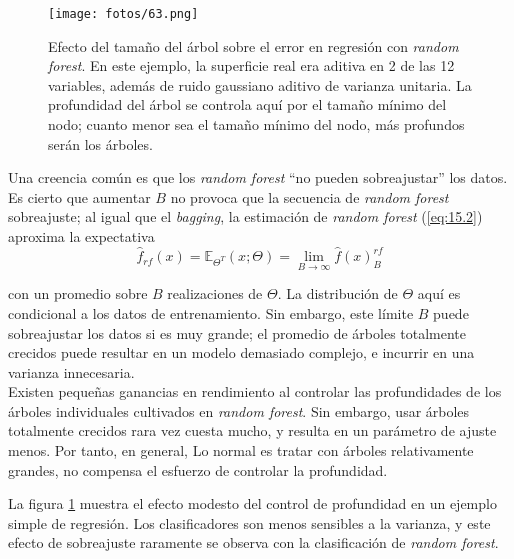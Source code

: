 \begin{figure}[H]
\centering
\texttt{[image: fotos/63.png]}
\caption{Efecto del tamaño del árbol sobre el error en regresión con \textit{random forest}. En este ejemplo, la superficie real era aditiva en 2 de las 12 variables, además de ruido gaussiano aditivo de varianza unitaria. La profundidad del árbol se controla aquí por el tamaño mínimo del nodo; cuanto menor sea el tamaño mínimo del nodo, más profundos serán los árboles.}
\label{fig:20.18}
\end{figure}

Una creencia común es que los \textit{random forest} ``no pueden sobreajustar'' los datos. Es cierto que aumentar $B$ no provoca que la secuencia de \textit{random forest} sobreajuste; al igual que el \textit{bagging}, la estimación de \textit{random forest} (\ref{eq:15.2}) aproxima la expectativa
\begin{equation}
\hat{f}_{rf} (x) = \mathbb{E}_{\Theta^T} (x; \Theta) = \lim_{B \to \infty} \hat{f} (x)_B^{rf}
\end{equation}

con un promedio sobre $B$ realizaciones de $\Theta$. La distribución de $\Theta$ aquí es condicional a los datos de entrenamiento. Sin embargo, este límite $B$ puede sobreajustar los datos si es muy grande; el promedio de árboles totalmente crecidos puede resultar en un modelo demasiado complejo, e
incurrir en una varianza innecesaria. \\

Existen pequeñas ganancias en rendimiento al controlar las profundidades de los árboles individuales cultivados en \textit{random forest}. Sin embargo, usar árboles totalmente crecidos rara vez cuesta mucho, y resulta en un parámetro de ajuste menos. Por tanto, en general, Lo normal es tratar con árboles relativamente grandes, no compensa el esfuerzo de controlar la profundidad.

La figura \ref{fig:20.18} muestra el efecto modesto del control de profundidad en un ejemplo simple de regresión. Los clasificadores son menos sensibles a la varianza, y este efecto de sobreajuste raramente se observa con la clasificación de \textit{random forest}. 